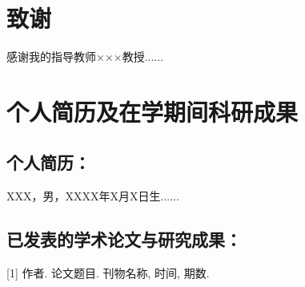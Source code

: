 \documentclass[UTF8,a4paper]{ctexart}
\begin{document}
\newpage
\section*{致\quad 谢}
感谢我的指导教师×××教授......

\newpage
\section*{个人简历及在学期间科研成果}
\subsection*{个人简历：}
XXX，男，XXXX年X月X日生......

\subsection*{已发表的学术论文与研究成果：}
[1] 作者. 论文题目. 刊物名称, 时间, 期数.
\end{document}
